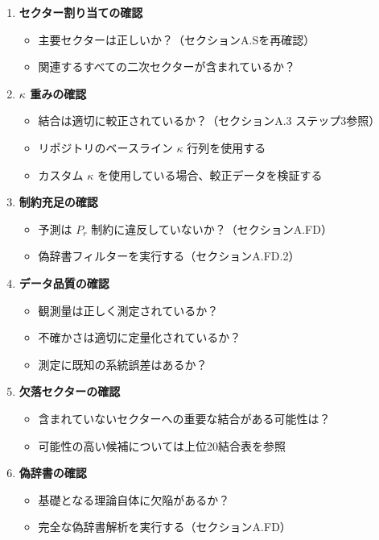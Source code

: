 \documentclass[13pt,a4paper]{ltjsarticle}
\begin{document}
	\begin{enumerate}
		\item \textbf{セクター割り当ての確認} 
		\begin{itemize}
			\item 主要セクターは正しいか？（セクションA.Sを再確認）
			\item 関連するすべての二次セクターが含まれているか？
		\end{itemize}
		
		\item \textbf{$\kappa$ 重みの確認}
		\begin{itemize}
			\item 結合は適切に較正されているか？（セクションA.3 ステップ3参照）
			\item リポジトリのベースライン $\kappa$ 行列を使用する
			\item カスタム $\kappa$ を使用している場合、較正データを検証する
		\end{itemize}
		
		\item \textbf{制約充足の確認}
		\begin{itemize}
			\item 予測は $P_r$ 制約に違反していないか？（セクションA.FD）
			\item 偽辞書フィルターを実行する（セクションA.FD.2）
		\end{itemize}
		
		\item \textbf{データ品質の確認}
		\begin{itemize}
			\item 観測量は正しく測定されているか？
			\item 不確かさは適切に定量化されているか？
			\item 測定に既知の系統誤差はあるか？
		\end{itemize}
		
		\item \textbf{欠落セクターの確認}
		\begin{itemize}
			\item 含まれていないセクターへの重要な結合がある可能性は？
			\item 可能性の高い候補については上位20結合表を参照
		\end{itemize}
		
		\item \textbf{偽辞書の確認}
		\begin{itemize}
			\item 基礎となる理論自体に欠陥があるか？
			\item 完全な偽辞書解析を実行する（セクションA.FD）
		\end{itemize}
		

\end{enumerate}
\end{document}
